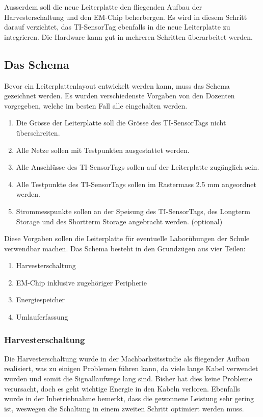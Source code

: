 Ausserdem soll die neue Leiterplatte den fliegenden Aufbau der Harvesterschaltung und den EM-Chip beherbergen. Es wird in diesem Schritt darauf verzichtet, das TI-SensorTag ebenfalls in die neue Leiterplatte zu integrieren. Die Hardware kann gut in mehreren Schritten überarbeitet werden.

\subsection{Das Schema}

Bevor ein Leiterplattenlayout entwickelt werden kann, muss das Schema gezeichnet werden. Es wurden verschiedenste Vorgaben von den Dozenten vorgegeben, welche im besten Fall alle eingehalten werden. 

\begin{enumerate}
    \item Die Grösse der Leiterplatte soll die Grösse des TI-SensorTags nicht überschreiten.
    \item Alle Netze sollen mit Testpunkten ausgestattet werden.
    \item Alle Anschlüsse des TI-SensorTags sollen auf der Leiterplatte zugänglich sein.
    \item Alle Testpunkte des TI-SensorTags sollen im Rastermass 2.5 mm angeordnet werden.
	\item Strommesspunkte sollen an der Speisung des TI-SensorTags, des Longterm Storage und des Shortterm Storage angebracht werden. (optional)
\end{enumerate}

Diese Vorgaben sollen die Leiterplatte für eventuelle Laborübungen der Schule verwendbar machen. Das Schema besteht in den Grundzügen aus vier Teilen:

\begin{enumerate}
    \item Harvesterschaltung
    \item EM-Chip inklusive zugehöriger Peripherie
    \item Energiespeicher
    \item Umlauferfassung
\end{enumerate}

\subsubsection{Harvesterschaltung}

Die Harvesterschaltung wurde in der Machbarkeitsstudie als fliegender Aufbau realisiert, was zu einigen Problemen führen kann, da viele lange Kabel verwendet wurden und somit die Signallaufwege lang sind. Bisher hat dies keine Probleme verursacht, doch es geht wichtige Energie in den Kabeln verloren. Ebenfalls wurde in der Inbetriebnahme bemerkt, dass die gewonnene Leistung sehr gering ist, weswegen die Schaltung in einem zweiten Schritt optimiert werden muss.

